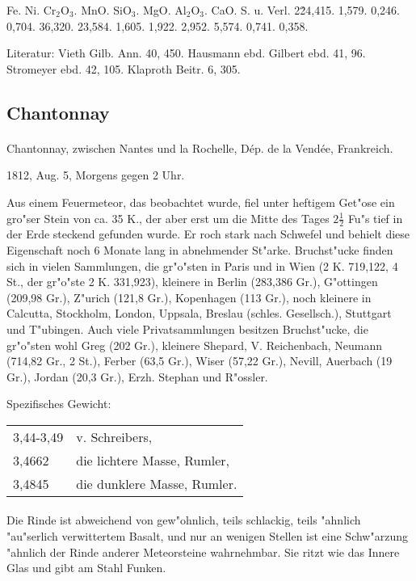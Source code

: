 \documentclass[a4paper, 11pt, oneside]{article}
\begin{document}
Fe. Ni. Cr$_{2}$O$_{3}$. MnO. SiO$_{3}$. MgO. Al$_{2}$O$_{3}$. CaO. S. u. Verl.  
2\. 24,415. 1,579. 0,246. 0,704. 36,320. 23,584. 1,605. 1,922. 2,952. 5,574. 0,741. 0,358.

Literatur: Vieth Gilb. Ann. 40, 450. Hausmann ebd. Gilbert ebd. 41, 96. Stromeyer ebd. 42, 105. Klaproth Beitr. 6, 305.

\subsection{Chantonnay}
\normalsize
\paragraph{}
Chantonnay, zwischen Nantes und la Rochelle, Dép. de la Vendée, Frankreich.

1812, Aug. 5, Morgens gegen 2 Uhr.

Aus einem Feuermeteor, das beobachtet wurde, fiel unter heftigem Get"ose ein gro"ser Stein von ca. 35 K., der aber erst um die Mitte des Tages $2\frac{1}{2}$ Fu"s tief in der Erde steckend gefunden wurde. Er roch stark nach Schwefel und behielt diese Eigenschaft noch 6 Monate lang in abnehmender St"arke. Bruchst"ucke finden sich in vielen Sammlungen, die gr"o"sten in Paris und in Wien (2 K. 719,122, 4 St., der gr"o"ste 2 K. 331,923), kleinere in Berlin (283,386 Gr.), G"ottingen (209,98 Gr.), Z"urich (121,8 Gr.), Kopenhagen (113 Gr.), noch kleinere in Calcutta, Stockholm, London, Uppsala, Breslau (schles. Gesellsch.), Stuttgart und T"ubingen. Auch viele Privatsammlungen besitzen Bruchst"ucke, die gr"o"sten wohl Greg (202 Gr.), kleinere Shepard, V. Reichenbach, Neumann (714,82 Gr., 2 St.), Ferber (63,5 Gr.),
Wiser (57,22 Gr.), Nevill, Auerbach (19 Gr.), Jordan (20,3 Gr.), Erzh. Stephan und R"ossler.

Spezifisches Gewicht:
\begin{table}[!ht]
    \centering
    \begin{tabular}{l l}
        3,44-3,49 & v. Schreibers,\\
        3,4662 & die lichtere Masse, Rumler,\\
        3,4845 & die dunklere Masse, Rumler.
    \end{tabular}
\end{table}
\paragraph{}
Die Rinde ist abweichend von gew"ohnlich, teils schlackig, teils "ahnlich "au"serlich verwittertem Basalt, und nur an wenigen Stellen ist eine Schw"arzung "ahnlich der Rinde anderer Meteorsteine wahrnehmbar. Sie ritzt wie das Innere Glas und gibt am Stahl Funken.
\end{document}
